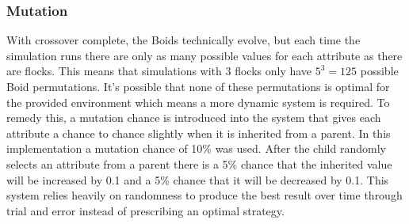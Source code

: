\documentclass{egpubl}
\begin{document}
\subsubsection{Mutation}
With crossover complete, the Boids technically evolve, but each time the simulation runs there are only as many possible values for each attribute as there are flocks. This means that simulations with 3 flocks only have $5^3 = 125$ possible Boid permutations. It's possible that none of these permutations is optimal for the provided environment which means a more dynamic system is required. To remedy this, a mutation chance is introduced into the system that gives each attribute a chance to chance slightly when it is inherited from a parent. In this implementation a mutation chance of 10\% was used. After the child randomly selects an attribute from a parent there is a 5\% chance that the inherited value will be increased by 0.1 and a 5\% chance that it will be decreased by 0.1. This system relies heavily on randomness to produce the best result over time through trial and error instead of prescribing an optimal strategy.
\end{document}
